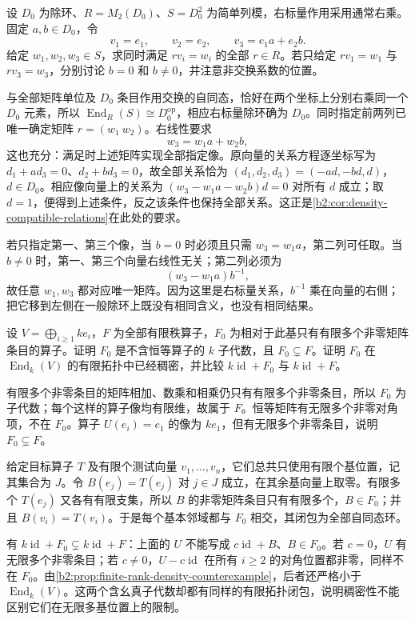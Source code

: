 \begin{exercise}\label{b2:ex:14-density-relations}
	设 \(D_0\) 为除环、\(R=M_2(D_0)\)、\(S=D_0^2\) 为简单列模，右标量作用采用通常右乘。固定 \(a,b\in D_0\)，令
	\[
		v_1=e_1,\qquad v_2=e_2,\qquad v_3=e_1a+e_2b.
	\]
	给定 \(w_1,w_2,w_3\in S\)，求同时满足 \(rv_i=w_i\) 的全部 \(r\in R\)。若只给定 \(rv_1=w_1\) 与 \(rv_3=w_3\)，分别讨论 \(b=0\) 和 \(b\ne0\)，并注意非交换系数的位置。
\end{exercise}
\begin{solution}
	与全部矩阵单位及 \(D_0\) 条目作用交换的自同态，恰好在两个坐标上分别右乘同一个 \(D_0\) 元素，所以 \(\operatorname{End}_R(S)\cong D_0^{\mathrm{op}}\)，相应右标量除环确为 \(D_0\)。同时指定前两列已唯一确定矩阵 \(r=(w_1\ w_2)\)。右线性要求
	\[
		w_3=w_1a+w_2b,
	\]
	这也充分：满足时上述矩阵实现全部指定像。原向量的关系方程逐坐标写为 \(d_1+ad_3=0\)、\(d_2+bd_3=0\)，故全部关系恰为 \((d_1,d_2,d_3)=(-ad,-bd,d)\)，\(d\in D_0\)。相应像向量上的关系为 \((w_3-w_1a-w_2b)d=0\) 对所有 \(d\) 成立；取 \(d=1\)，便得到上述条件，反之该条件也保持全部关系。这正是\cref{b2:cor:density-compatible-relations}在此处的要求。

	若只指定第一、第三个像，当 \(b=0\) 时必须且只需 \(w_3=w_1a\)，第二列可任取。当 \(b\ne0\) 时，第一、第三个向量右线性无关；第二列必须为
	\[
		(w_3-w_1a)b^{-1},
	\]
	故任意 \(w_1,w_3\) 都对应唯一矩阵。因为这里是右标量关系，\(b^{-1}\) 乘在向量的右侧；把它移到左侧在一般除环上既没有相同含义，也没有相同结果。
\end{solution}

\begin{exercise}\label{b2:ex:14-finite-rank-commutant}
	设 \(V=\bigoplus_{i\ge1}ke_i\)，\(F\) 为全部有限秩算子，\(F_0\) 为相对于此基只有有限多个非零矩阵条目的算子。证明 \(F_0\) 是不含恒等算子的 \(k\) 子代数，且 \(F_0\subsetneq F\)。证明 \(F_0\) 在 \(\operatorname{End}_k(V)\) 的有限拓扑中已经稠密，并比较 \(k\operatorname{id}+F_0\) 与 \(k\operatorname{id}+F\)。
\end{exercise}
\begin{solution}
	有限多个非零条目的矩阵相加、数乘和相乘仍只有有限多个非零条目，所以 \(F_0\) 为子代数；每个这样的算子像均有限维，故属于 \(F\)。恒等矩阵有无限多个非零对角项，不在 \(F_0\)。算子 \(U(e_i)=e_1\) 的像为 \(ke_1\)，但有无限多个非零条目，说明 \(F_0\subsetneq F\)。

	给定目标算子 \(T\) 及有限个测试向量 \(v_1,\ldots,v_n\)，它们总共只使用有限个基位置，记其集合为 \(J\)。令 \(B(e_j)=T(e_j)\) 对 \(j\in J\) 成立，在其余基向量上取零。有限多个 \(T(e_j)\) 又各有有限支集，所以 \(B\) 的非零矩阵条目只有有限多个，\(B\in F_0\)；并且 \(B(v_i)=T(v_i)\)。于是每个基本邻域都与 \(F_0\) 相交，其闭包为全部自同态环。

	有 \(k\operatorname{id}+F_0\subsetneq k\operatorname{id}+F\)：上面的 \(U\) 不能写成 \(c\operatorname{id}+B\)、\(B\in F_0\)。若 \(c=0\)，\(U\) 有无限多个非零条目；若 \(c\ne0\)，\(U-c\operatorname{id}\) 在所有 \(i\ge2\) 的对角位置都非零，同样不在 \(F_0\)。由\cref{b2:prop:finite-rank-density-counterexample}，后者还严格小于 \(\operatorname{End}_k(V)\)。这两个含幺真子代数却都有同样的有限拓扑闭包，说明稠密性不能区别它们在无限多基位置上的限制。
\end{solution}

